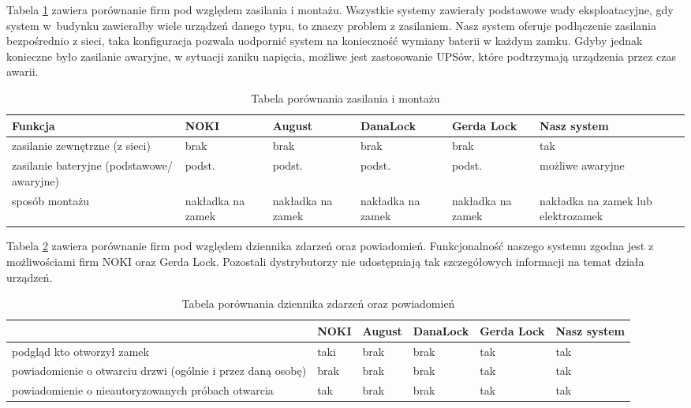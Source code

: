  	\newpage
 	Tabela \ref{tab:porownanie2} zawiera porównanie firm pod względem zasilania i montażu. Wszystkie systemy zawierały podstawowe wady eksploatacyjne, gdy system w~budynku zawierałby wiele urządzeń danego typu, to znaczy problem z zasilaniem. Nasz system oferuje podłączenie zasilania bezpośrednio z sieci, taka konfiguracja pozwala uodpornić system na konieczność wymiany baterii w każdym zamku. Gdyby jednak konieczne było zasilanie awaryjne, w sytuacji zaniku napięcia, możliwe jest zastosowanie UPSów, które podtrzymają urządzenia przez czas awarii.
 \begin{longtable}[!ht]{|m{2.9cm}|m{1.3cm}|m{1.3cm}|m{}|m{}|m{}|} 
 	\caption{Tabela porównania zasilania i montażu}
 	\label{tab:porownanie2}\\
 	\hline	
 	Funkcja & NOKI & August &DanaLock & Gerda Lock & Nasz \linebreak system \\	\hline
 	zasilanie zewnętrzne (z sieci)	
 	& brak & brak & brak & brak & tak \\	\hline
	 zasilanie bateryjne (podstawowe/ awaryjne)	
	 & podst. & podst. &podst. & podst. & możliwe awaryjne \\	\hline
 	sposób montażu	
 	& nakładka na \linebreak zamek & nakładka na \linebreak zamek & nakładka na \linebreak zamek & nakładka na \linebreak zamek & nakładka na \linebreak zamek lub elektrozamek  \\	\hline
 \end{longtable}
 
Tabela \ref{tab:porownanie3} zawiera porównanie firm pod względem dziennika zdarzeń oraz powiadomień. Funkcjonalność naszego systemu zgodna jest z możliwościami firm NOKI oraz Gerda Lock. Pozostali dystrybutorzy nie udostępniają tak szczegółowych informacji na temat działa urządzeń.
\begin{longtable}[!ht]{|m{4cm}|m{1cm}|m{1cm}|m{}|m{1cm}|m{}|} 
	\caption{Tabela porównania dziennika zdarzeń oraz powiadomień}
	\label{tab:porownanie3}\\
	\hline	
	& NOKI & August & DanaLock & Gerda Lock & Nasz system \\	\hline
	podgląd kto otworzył zamek
	& taki & brak & brak & tak & tak \\	\hline
	powiadomienie o otwarciu drzwi (ogólnie i przez daną osobę)
	& brak & brak & brak & tak & tak  \\	\hline
	powiadomienie o nieautoryzowanych próbach otwarcia
	& tak & brak & brak & tak & tak  \\	\hline
\end{longtable}

